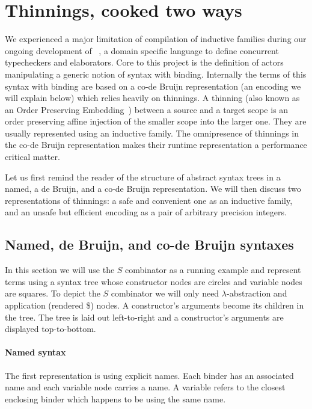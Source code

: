\section{Thinnings, cooked two ways}\label{sec:codebruijn}

We experienced a major limitation of compilation of inductive families
during our ongoing development of
\typos~\cite{MANUAL:talk/types/Allais22}, a domain specific language
to define concurrent typecheckers and elaborators.
%
Core to this project is the definition of actors manipulating a generic notion
of syntax with binding.
%
Internally the terms of this syntax with binding are based on a co-de Bruijn
representation (an encoding we will explain below) which relies heavily on
thinnings.
%
A thinning (also known as an Order Preserving
Embedding~\cite{MANUAL:phd/nott/Chapman09})
between a source and a target scope is an order preserving affine injection
of the smaller scope into the larger one.
%
They are usually represented using an inductive family.
%
The omnipresence of thinnings in the co-de Bruijn representation makes their
runtime representation a performance critical matter.

Let us first remind the reader of the structure of abstract syntax trees in a
named, a de Bruijn, and a co-de Bruijn representation. We will then discuss two
representations of thinnings: a safe and convenient one as an inductive family,
and an unsafe but efficient encoding as a pair of arbitrary precision integers.

\subsection{Named, de Bruijn, and co-de Bruijn syntaxes}

In this section we will use the $S$ combinator as a running example and represent
terms using a syntax tree whose constructor nodes are circles and variable nodes
are squares.
%
To depict the $S$ combinator we will only need $\lambda{}$-abstraction and
application (rendered \$) nodes. A constructor's arguments become its children
in the tree.
%
The tree is laid out left-to-right and a constructor's arguments are displayed
top-to-bottom.

\paragraph{Named syntax}
The first representation is using explicit names. Each binder has an associated
name and each variable node carries a name. A variable refers to the closest enclosing
binder which happens to be using the same name.


